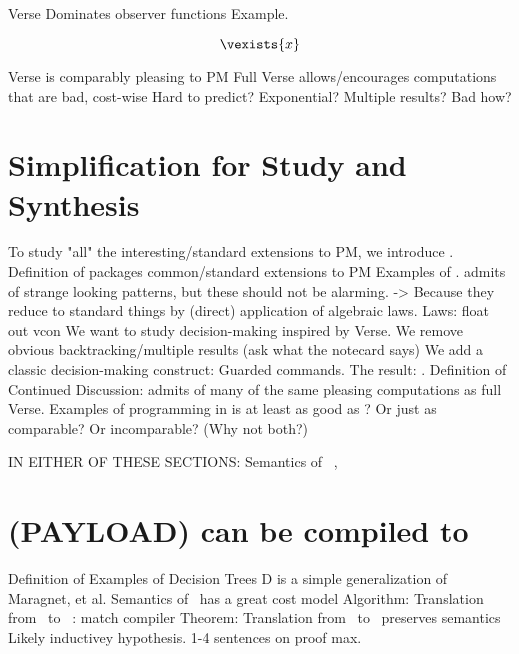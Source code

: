 \documentclass[manuscript,screen,review, 12pt]{acmart}
\begin{document}
\begin{outline}[enumerate]
    \1 Verse Dominates observer functions 
        \2 Example. 

        \[
          \vexists{x}   
        \]

    \1 Verse is comparably pleasing to PM 
    \1 Full Verse allows/encourages computations that are bad, cost-wise 
        \2 Hard to predict?
        \2 Exponential?
        \2 Multiple results?
        \2 Bad how? 
    \end{outline}
\section{Simplification for Study and Synthesis}
\begin{outline}[enumerate]
    \1 To study "all" the interesting/standard extensions to PM, we introduce
    \PPlus.
    \2 Definition of \PPlus
    \2 {\PPlus} packages common/standard extensions to PM
        \3 Examples of \PPlus. 
    \2 \PPlus admits of strange looking patterns, but these should not be alarming. 
    \2 -> Because they reduce to standard things by (direct) application of algebraic laws. 
        \3 Laws: float out vcon 
    \1 We want to study decision-making inspired by Verse. 
        \2 We remove obvious backtracking/multiple results (ask what the notecard says)
        \2 We add a classic decision-making construct: Guarded commands. 
        \2 The result: \VMinus. 
    \1 Definition of \VMinus
    \1 Continued Discussion:
    \2 {\VMinus} admits of many of the same pleasing computations as full Verse. 
    \2 Examples of programming in \VMinus 
    \2 {\VMinus} is at least as good as {\PPlus}? Or just as comparable? 
        Or incomparable? (Why not both?)
    \end{outline}

IN EITHER OF THESE SECTIONS: Semantics of \PPlus\ , \VMinus

\section{(PAYLOAD) {\VMinus} can be compiled to }
\begin{outline}[enumerate]
    \1 Definition of \D 
    \1 Examples of Decision Trees 
    \1 D is a simple generalization of Maragnet, et al. 
    \1 Semantics of \D 
    \1 \D\ has a great cost model
    \1 Algorithm: Translation from \VMinus\ to \D\ : match compiler 
    \1 Theorem: Translation from \VMinus\ to \D\ preserves semantics 
    \2 Likely inductivey hypothesis. 1-4 sentences on proof max. 
\end{outline}
\end{document}
